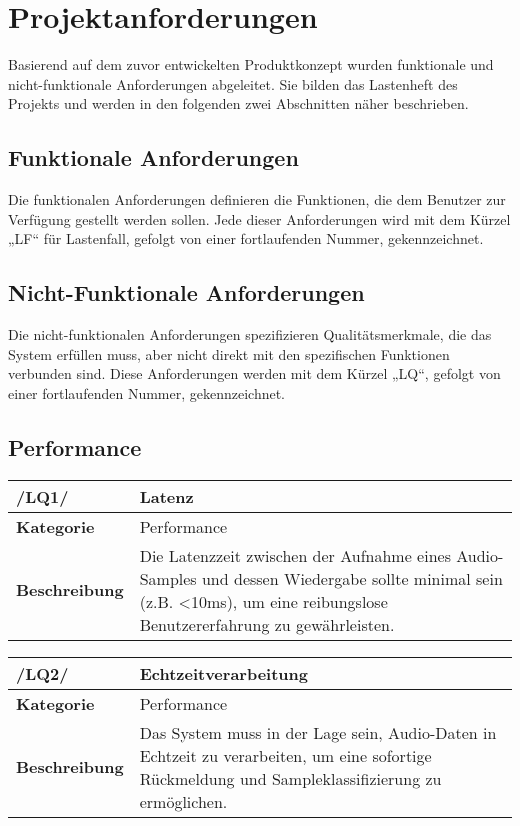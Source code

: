 \newpage
\section{Projektanforderungen}

Basierend auf dem zuvor entwickelten Produktkonzept wurden funktionale und nicht-funktionale Anforderungen abgeleitet. Sie bilden das Lastenheft des Projekts und werden in den folgenden zwei Abschnitten näher beschrieben.

\subsection{Funktionale Anforderungen}
Die funktionalen Anforderungen definieren die Funktionen, die dem Benutzer zur Verfügung gestellt werden sollen. Jede dieser Anforderungen wird mit dem Kürzel „LF“ für Lastenfall, gefolgt von einer fortlaufenden Nummer, gekennzeichnet.



\newpage

\subsection{Nicht-Funktionale Anforderungen}
Die nicht-funktionalen Anforderungen spezifizieren Qualitätsmerkmale, die das System erfüllen muss, aber nicht direkt mit den spezifischen Funktionen verbunden sind. Diese Anforderungen werden mit dem Kürzel „LQ“, gefolgt von einer fortlaufenden Nummer, gekennzeichnet.


\subsection{Performance}

\begin{table}[h!]
\begin{tabularx}{13cm}{|l|X|}
\hline
\textbf{/LQ1/} & \textbf{Latenz} \\ \hline
\textbf{Kategorie} & Performance \\ \hline
\textbf{Beschreibung} & Die Latenzzeit zwischen der Aufnahme eines Audio-Samples und dessen Wiedergabe sollte minimal sein (z.B. <10ms), um eine reibungslose Benutzererfahrung zu gewährleisten. \\ \hline
\end{tabularx}
\end{table}

\begin{table}[h!]
\begin{tabularx}{13cm}{|l|X|}
\hline
\textbf{/LQ2/} & \textbf{Echtzeitverarbeitung} \\ \hline
\textbf{Kategorie} & Performance \\ \hline
\textbf{Beschreibung} & Das System muss in der Lage sein, Audio-Daten in Echtzeit zu verarbeiten, um eine sofortige Rückmeldung und Sampleklassifizierung zu ermöglichen. \\ \hline
\end{tabularx}
\end{table}

